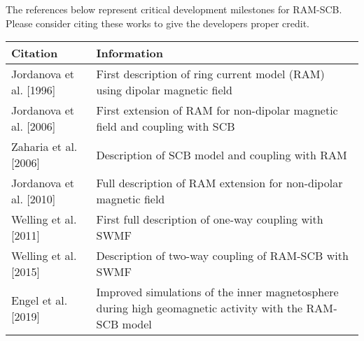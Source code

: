 The references below represent critical development milestones for RAM-SCB. Please consider citing these works to give the developers proper credit.


\begin{table}[ht]
  \centering
  \begin{tabular}{l|l}
    Citation & Information \\
    \hline
    \hline
    Jordanova et al. [1996] & First description of ring current model (RAM) using dipolar magnetic field \\
    \hline
    Jordanova et al. [2006] & First extension of RAM for non-dipolar magnetic field and coupling with SCB \\
    \hline
    Zaharia et al. [2006] & Description of SCB model and coupling with RAM \\
    \hline
    Jordanova et al. [2010] & Full description of RAM extension for non-dipolar magnetic field \\
    \hline
    Welling et al. [2011] & First full description of one-way coupling with SWMF \\
    \hline
    Welling et al. [2015] & Description of two-way coupling of RAM-SCB with SWMF \\
    \hline
    Engel et al. [2019] & Improved simulations of the inner magnetosphere during high geomagnetic activity with the RAM‐SCB model \\
  \end{tabular}
\end{table}




